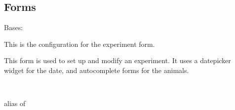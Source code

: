 \documentclass[letterpaper,10pt,english]{sphinxmanual}
\begin{document}
\subsection{Forms}
\label{api:forms}\label{api:module-data.forms}

\begin{fulllineitems}
\label{api:data.forms.ExperimentForm}
Bases: 

This is the configuration for the experiment form.

This form is used to set up and modify an experiment.  It uses a datepicker widget for the date, and autocomplete forms for the animals.


\begin{fulllineitems}
\label{api:data.forms.ExperimentForm.Media}
\end{fulllineitems}



\begin{fulllineitems}
\label{api:data.forms.ExperimentForm.Meta}~

\begin{fulllineitems}
\label{api:data.forms.ExperimentForm.Meta.model}
alias of 

\end{fulllineitems}


\end{fulllineitems}



\begin{fulllineitems}
\label{api:data.forms.ExperimentForm.media}
\end{fulllineitems}


\end{fulllineitems}
\end{document}
